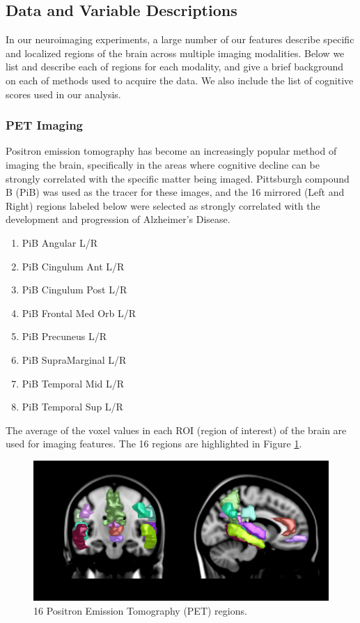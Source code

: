 \subsection{Data and Variable Descriptions}
In our neuroimaging experiments, a large number of our features describe specific and localized regions of the brain across multiple imaging modalities. Below we list and describe each of regions for each modality, and give a brief background on each of methods used to acquire the data. We also include the list of cognitive scores used in our analysis.

\subsubsection{PET Imaging}
Positron emission tomography has become an increasingly popular method of imaging the brain, specifically in the areas where cognitive decline can be strongly correlated with the specific matter being imaged. Pittsburgh compound B (PiB) was used as the tracer for these images, and the 16 mirrored (Left and Right) regions labeled below were selected as strongly correlated with the development and progression of Alzheimer's Disease.
{\small
\begin{enumerate}
\item PiB Angular L/R
\item PiB Cingulum Ant L/R
\item PiB Cingulum Post L/R
\item PiB Frontal Med Orb L/R
\item PiB Precuneus L/R
\item PiB SupraMarginal L/R
\item PiB Temporal Mid L/R
\item PiB Temporal Sup L/R
\end{enumerate}
}

The average of the voxel values in each ROI (region of interest) of the brain are used for imaging features.
The 16 regions are highlighted in Figure \ref{fig:pibrois}.

\begin{figure}
\centering
  \includegraphics[width=\textwidth]{3_covtraj/figs/PiBROIsMontage.png}
  \caption{\label{fig:pibrois}16 Positron Emission Tomography (PET) regions.}
\end{figure}

